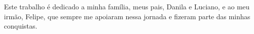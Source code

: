         Este trabalho é dedicado a minha família, meus pais, Danila e Luciano, e ao meu irmão, Felipe, que sempre me apoiaram nessa jornada e fizeram parte das minhas conquistas.
